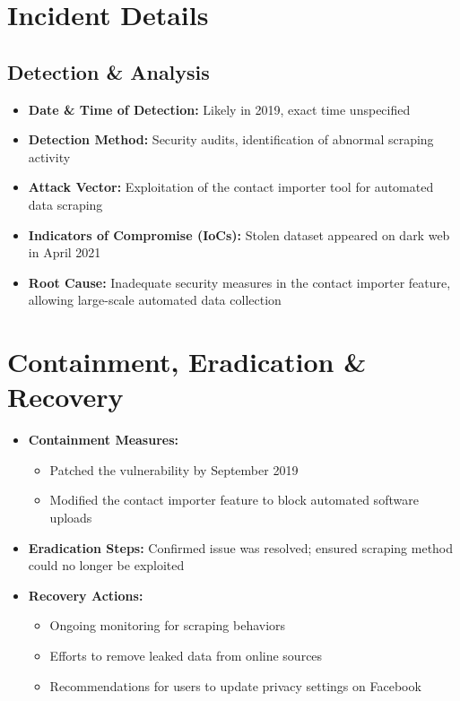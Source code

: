 \documentclass[11pt]{book}
\begin{document}
\section{Incident Details}
\subsection{Detection \& Analysis}
\begin{itemize}
    \item \textbf{Date \& Time of Detection:} Likely in 2019, exact time unspecified
    \item \textbf{Detection Method:} Security audits, identification of abnormal scraping activity
    \item \textbf{Attack Vector:} Exploitation of the contact importer tool for automated data scraping
    \item \textbf{Indicators of Compromise (IoCs):} Stolen dataset appeared on dark web in April 2021
    \item \textbf{Root Cause:} Inadequate security measures in the contact importer feature, allowing large-scale automated data collection
\end{itemize}

\section{Containment, Eradication \& Recovery}
\begin{itemize}
    \item \textbf{Containment Measures:} 
    \begin{itemize}
        \item Patched the vulnerability by September 2019
        \item Modified the contact importer feature to block automated software uploads
    \end{itemize}
    \item \textbf{Eradication Steps:} Confirmed issue was resolved; ensured scraping method could no longer be exploited
    \item \textbf{Recovery Actions:} 
    \begin{itemize}
        \item Ongoing monitoring for scraping behaviors
        \item Efforts to remove leaked data from online sources
        \item Recommendations for users to update privacy settings on Facebook
    \end{itemize}
\end{itemize}
\end{document}
